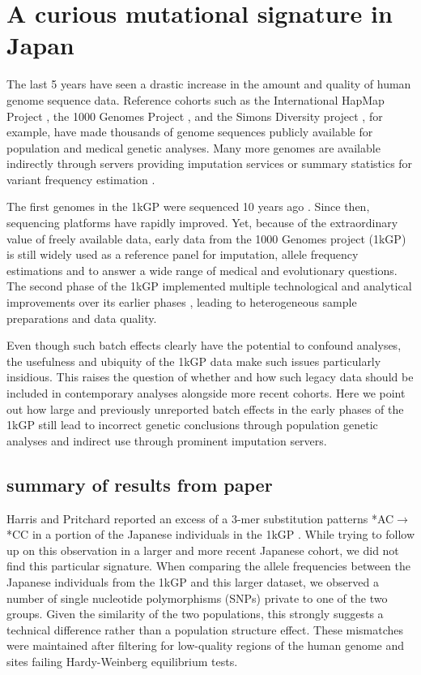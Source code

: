 \documentclass[
11pt, %
oneside, %
english, %
doublespacing, %
headsepline, %
]{MastersDoctoralThesis} %
\begin{document}
\chapter{A curious mutational signature in Japan}
The last 5 years have seen a drastic increase in the amount and quality of human genome sequence data. 
Reference cohorts such as the International HapMap Project \citep{HapMap2005}, the 1000 Genomes Project \citep{1000GenomesProjectConsortium2010,The1000GenomesProjectConsortium2012}, and the Simons Diversity project \citep{Mallick2016}, for example, have made thousands of genome sequences publicly available for population and medical genetic analyses. 
Many more genomes are available indirectly through servers providing imputation services \citep{HapMap2005} or summary statistics for variant frequency estimation \citep{Lek2016}.

The first genomes in the 1kGP were sequenced 10 years ago \citep{VanDijk2014}. Since then, sequencing platforms have rapidly improved. 
Yet, because of the extraordinary value of freely available data, early data from the 1000 Genomes project (1kGP) is still widely used as a reference panel for imputation, allele frequency estimations and to answer a wide range of medical and evolutionary questions. 
The second phase of the 1kGP implemented multiple technological and analytical improvements over its earlier phases \citep{The1000GenomesProjectConsortium2012}, leading to heterogeneous sample preparations and data quality.

Even though such batch effects clearly have the potential to confound analyses, the usefulness and ubiquity of the 1kGP data make such issues particularly insidious.   
This raises the question of whether and how such legacy data should be included in contemporary analyses alongside more recent cohorts.
Here we point out how large and previously unreported batch effects in the early phases of the 1kGP still lead to incorrect genetic conclusions through population genetic analyses and indirect use through prominent imputation servers.
\section{summary of results from paper}
Harris and Pritchard reported an excess of a 3-mer substitution patterns *AC${\rightarrow}$*CC in a portion of the Japanese individuals in the 1kGP \citep{Harris2017a}.
While trying to follow up on this observation in a larger and more recent Japanese cohort, we did not find this particular signature.
When comparing the allele frequencies between the Japanese individuals from the 1kGP and this larger dataset, we observed a number of single nucleotide polymorphisms (SNPs) private to one of the two groups.
Given the similarity of the two populations, this strongly suggests a technical difference rather than a population structure effect.
These mismatches were maintained after filtering for low-quality regions of the human genome and sites failing Hardy-Weinberg equilibrium tests.
\end{document}
